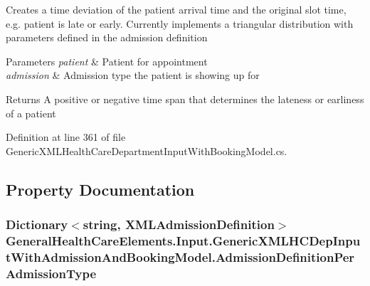 Creates a time deviation of the patient arrival time and the original slot time, e.\+g. patient is late or early. Currently implements a triangular distribution with parameters defined in the admission definition 


\begin{DoxyParams}{Parameters}
{\em patient} & Patient for appointment\\
\hline
{\em admission} & Admission type the patient is showing up for\\
\hline
\end{DoxyParams}
\begin{DoxyReturn}{Returns}
A positive or negative time span that determines the lateness or earliness of a patient
\end{DoxyReturn}


Definition at line 361 of file Generic\+X\+M\+L\+Health\+Care\+Department\+Input\+With\+Booking\+Model.\+cs.



\subsection{Property Documentation}
\subsubsection[{\texorpdfstring{Admission\+Definition\+Per\+Admission\+Type}{AdmissionDefinitionPerAdmissionType}}]{\setlength{\rightskip}{0pt plus 5cm}Dictionary$<$string, {\bf X\+M\+L\+Admission\+Definition}$>$ General\+Health\+Care\+Elements.\+Input.\+Generic\+X\+M\+L\+H\+C\+Dep\+Input\+With\+Admission\+And\+Booking\+Model.\+Admission\+Definition\+Per\+Admission\+Type\hspace{0.3cm}{\ttfamily [get]}}\hypertarget{class_general_health_care_elements_1_1_input_1_1_generic_x_m_l_h_c_dep_input_with_admission_and_booking_model_ab9abefadffcb04d4eed18f8f8ab4882a}{}\label{class_general_health_care_elements_1_1_input_1_1_generic_x_m_l_h_c_dep_input_with_admission_and_booking_model_ab9abefadffcb04d4eed18f8f8ab4882a}


